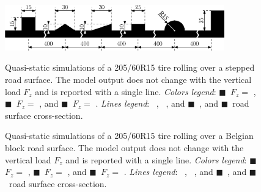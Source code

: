 \begin{figure}[htb]
  \centering
  \hspace{1.5cm}\includegraphics[width=9.5cm]{./figures/appendix_2/steps_ipe}\\[0.1in]
  \caption{Quasi-static simulations of a 205/60R15 tire rolling over a stepped road surface. The \TMEasy{} model output does not change with the vertical load $F_z$ and is reported with a single line. \emph{Colors legend}: {\color{mycolor1}$\blacksquare$}~$F_z =$ , {\color{mycolor2}$\blacksquare$}~$F_z =$ , and {\color{mycolor3}$\blacksquare$}~$F_z =$ . \emph{Lines legend}: \raisebox{1.0pt}{\textbf{---}}~\Enve{}, \raisebox{1.0pt}{\textbf{-- --}}~\Swift{}, and {\color{mycolor5}$\blacksquare$}~\TMEasy{}, and {\color{black}$\blacksquare$}~road surface cross-section.}
  \label{app2:fig:steps}
\end{figure}


\begin{figure}[htb]
  \centering
  \caption{Quasi-static simulations of a 205/60R15 tire rolling over a Belgian block road surface. The \TMEasy{} model output does not change with the vertical load $F_z$ and is reported with a single line. \emph{Colors legend}: {\color{mycolor1}$\blacksquare$}~$F_z =$ , {\color{mycolor2}$\blacksquare$}~$F_z =$ , and {\color{mycolor3}$\blacksquare$}~$F_z =$ . \emph{Lines legend}: \raisebox{1.0pt}{\textbf{---}}~\Enve{}, \raisebox{1.0pt}{\textbf{-- --}}~\Swift{}, and {\color{mycolor5}$\blacksquare$}~\TMEasy{}, and {\color{black}$\blacksquare$}~road surface cross-section.}
  \label{app2:fig:cobblestone}
\end{figure}

